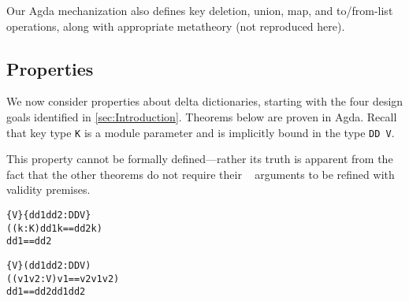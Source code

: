 Our Agda mechanization also defines key deletion, union, map, and to/from-list operations, along
with appropriate metatheory (not reproduced here).



\subsection{Properties}
\label{sec:DD:props}

We now consider properties about delta dictionaries, starting with the four design goals identified in \autoref{sec:Introduction}.
%
Theorems below are proven in Agda.
%
Recall that key type \verb+K+ is a module parameter and is implicitly bound in the type \verb+DD V+.



\begin{remark}[\SemTot]
%
\textnormal{This property cannot be formally defined---rather its truth is apparent from the fact that the other theorems do not require their \dd~ arguments to be refined with validity premises.}
%
\end{remark}

\begin{theorem}[\SemInj]
\label{thm:SemInj}
\justIndent
\begin{alltt}
  \altFAll\{V\} \{dd1 dd2 : DD V\} \altRArr
    ((k : K) \altRArr dd1 \altLAng k \altRAng == dd2 \altLAng k \altRAng) \altRArr
    dd1 == dd2
\end{alltt}
\end{theorem}

\begin{theorem}[\EqDec]
\label{thm:EqDec}
\justIndent
\begin{alltt}
  \altFAll\{V\} (dd1 dd2 : DD V) \altRArr
    ((v1 v2 : V) \altRArr v1 == v2 \altOr v1 \altNE v2) \altRArr
    dd1 == dd2 \altOr dd1 \altNE dd2
\end{alltt}
\end{theorem}

